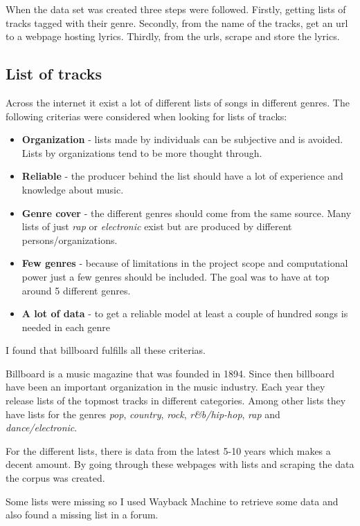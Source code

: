 \documentclass[a4paper, 12pt]{article}
\begin{document}
When the data set was created three steps were followed.
Firstly, getting lists of tracks tagged with their genre.
Secondly, from the name of the tracks, get an url to a webpage hosting lyrics.
Thirdly, from the urls, scrape and store the lyrics.

\subsection{List of tracks}
Across the internet it exist a lot of different lists of songs in different genres.
The following criterias were considered when looking for lists of tracks:
\begin{itemize}
    \item {\textbf{Organization} - lists made by individuals can be subjective and is avoided. Lists by organizations tend to be more thought through.}
    \item {\textbf{Reliable} - the producer behind the list should have a lot of experience and knowledge about music.}
    \item {\textbf{Genre cover} - the different genres should come from the same source. Many lists of just \textit{rap} or \textit{electronic} exist but are produced by different persons/organizations.}
    \item {\textbf{Few genres} - because of limitations in the project scope and computational power just a few genres should be included. The goal was to have at top around 5 different genres.}
    \item {\textbf{A lot of data} - to get a reliable model at least a couple of hundred songs is needed in each genre}
\end{itemize}

I found that billboard fulfills all these criterias.

Billboard is a music magazine that was founded in 1894.
Since then billboard have been an important organization in the music industry.
Each year they release lists of the topmost tracks in different categories.
Among other lists they have lists for the genres \textit{pop}, \textit{country}, \textit{rock}, \textit{r\&b/hip-hop}, \textit{rap} and \textit{dance/electronic}.

For the different lists, there is data from the latest 5-10 years which makes a decent amount.
By going through these webpages with lists and scraping the data the corpus was created.

Some lists were missing so I used Wayback Machine  to retrieve some data and also found a missing list in a forum.
\end{document}
